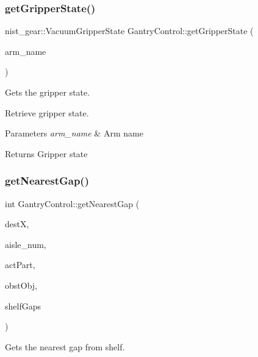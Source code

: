 \subsubsection{\texorpdfstring{get\+Gripper\+State()}{getGripperState()}}
{\footnotesize\ttfamily nist\+\_\+gear\+::\+Vacuum\+Gripper\+State Gantry\+Control\+::get\+Gripper\+State (\begin{DoxyParamCaption}\item[{std\+::string}]{arm\+\_\+name }\end{DoxyParamCaption})}



Gets the gripper state. 

Retrieve gripper state.


\begin{DoxyParams}{Parameters}
{\em arm\+\_\+name} & Arm name \\
\hline
\end{DoxyParams}
\begin{DoxyReturn}{Returns}
Gripper state 
\end{DoxyReturn}
\mbox{\label{classGantryControl_ab475e912ab1ea0d13efc10078695102e}} 
\subsubsection{\texorpdfstring{get\+Nearest\+Gap()}{getNearestGap()}}
{\footnotesize\ttfamily int Gantry\+Control\+::get\+Nearest\+Gap (\begin{DoxyParamCaption}\item[{float}]{destX,  }\item[{int}]{aisle\+\_\+num,  }\item[{bool}]{act\+Part,  }\item[{\hyperlink{classObstaclesInAisle}{Obstacles\+In\+Aisle} \&}]{obst\+Obj,  }\item[{const std\+::vector$<$ std\+::pair$<$ float, float $>$ $>$ \&}]{shelf\+Gaps }\end{DoxyParamCaption})}



Gets the nearest gap from shelf. 


